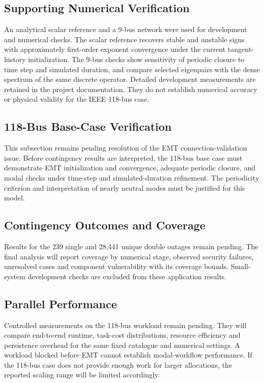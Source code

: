 \documentclass[journal]{IEEEtran}
\begin{document}
\subsection{Supporting Numerical Verification}
An analytical scalar reference and a 9-bus network were used for development and numerical checks. The scalar reference recovers stable and unstable signs with approximately first-order exponent convergence under the current tangent-history initialization. The 9-bus checks show sensitivity of periodic closure to time step and simulated duration, and compare selected eigenpairs with the dense spectrum of the same discrete operator. Detailed development measurements are retained in the project documentation. They do not establish numerical accuracy or physical validity for the IEEE 118-bus case.

\subsection{118-Bus Base-Case Verification}
This subsection remains pending resolution of the EMT connection-validation issue. Before contingency results are interpreted, the 118-bus base case must demonstrate EMT initialization and convergence, adequate periodic closure, and modal checks under time-step and simulated-duration refinement. The periodicity criterion and interpretation of nearly neutral modes must be justified for this model.

\subsection{Contingency Outcomes and Coverage}
Results for the 239 single and 28,441 unique double outages remain pending. The final analysis will report coverage by numerical stage, observed security failures, unresolved cases and component vulnerability with its coverage bounds. Small-system development checks are excluded from these application results.

\subsection{Parallel Performance}
Controlled measurements on the 118-bus workload remain pending. They will compare end-to-end runtime, task-cost distributions, resource efficiency and persistence overhead for the same fixed catalogue and numerical settings. A workload blocked before EMT cannot establish modal-workflow performance. If the 118-bus case does not provide enough work for larger allocations, the reported scaling range will be limited accordingly.
\end{document}
